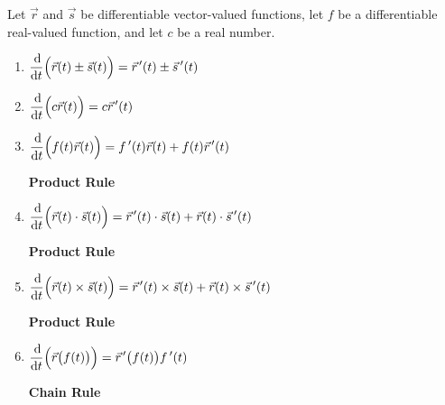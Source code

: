 \begin{theorem}\label{thm:vvf_deriv_prop}%
Let $\vec r$ and $\vec s$ be differentiable vector-valued functions, let $f$ be a differentiable real-valued function, and let $c$ be a real number.
\begin{enumerate}
	\item $\displaystyle \frac{\operatorname{d}\!}{\operatorname{d}\! t}\Bigl(\vec r(t) \pm \vec s(t)\Bigr) = \vec r\hskip1.25pt '(t) \pm \vec s\,'(t)$
	\item $\displaystyle \frac{\operatorname{d}\!}{\operatorname{d}\! t}\Bigl(c\vec r(t)\Bigr) = c\vec r\hskip1.25pt '(t)$
	\item \parbox{200pt}{$\displaystyle \frac{\operatorname{d}\!}{\operatorname{d}\! t}\Bigl(f(t)\vec r(t)\Bigr) = f\,'(t)\vec r(t) + f(t)\vec r\hskip1.25pt '(t)$} \textbf{Product Rule}
	\item \parbox{200pt}{$\displaystyle \frac{\operatorname{d}\!}{\operatorname{d}\! t}\Bigl(\vec r(t)\cdot \vec s(t) \Bigr) = \vec r\hskip1.25pt '(t)\cdot \vec s(t) + \vec r(t)\cdot \vec s\,'(t)$} \textbf{Product Rule}
	\item\label{crossprodrule} \parbox{200pt}{$\displaystyle \frac{\operatorname{d}\!}{\operatorname{d}\! t}\Bigl(\vec r(t)\times \vec s(t) \Bigr) = \vec r\hskip1.25pt '(t)\times \vec s(t) + \vec r(t)\times \vec s\,'(t)$} \textbf{Product Rule}
%
	\item \parbox{200pt}{$\displaystyle \frac{\operatorname{d}\!}{\operatorname{d}\! t}\Bigl(\vec r\bigl(f(t)\bigr)\Bigr) = \vec r\hskip1.25pt '\bigl(f(t)\bigr)f\,'(t)$}  \textbf{Chain Rule}
\end{enumerate}
\end{theorem}

